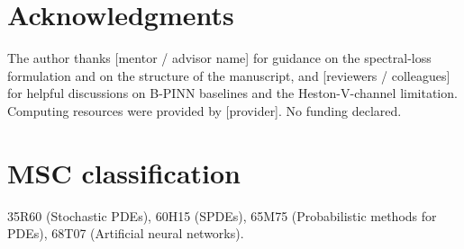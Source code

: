 \documentclass[review,12pt]{elsarticle}
\begin{document}
\section*{Acknowledgments}

The author thanks [mentor / advisor name] for guidance on the
spectral-loss formulation and on the structure of the manuscript,
and [reviewers / colleagues] for helpful discussions on
B-PINN baselines and the Heston-V-channel limitation. Computing
resources were provided by [provider]. No funding declared.

\section*{MSC classification}

35R60 (Stochastic PDEs), 60H15 (SPDEs), 65M75 (Probabilistic
methods for PDEs), 68T07 (Artificial neural networks).



\end{document}
